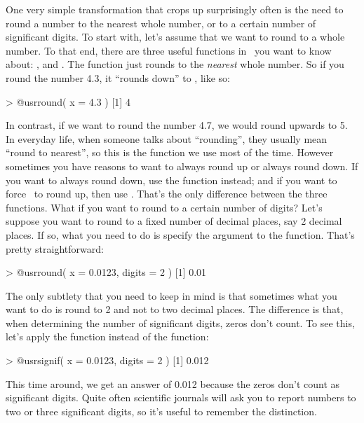 One very simple transformation that crops up surprisingly often is the need to round a number to the nearest whole number, or to a certain number of significant digits. To start with, let's assume that we want to round to a whole number. To that end, there are three useful functions in \R\ you want to know about: ,  and . The  function just rounds to the {\it nearest} whole number. So if you round the number 4.3, it ``rounds down'' to , like so:
\begin{rblock1}
> @usr{round( x = 4.3 )}
[1] 4
\end{rblock1}
In contrast, if we want to round the number 4.7, we would round upwards to 5. 
In everyday life, when someone talks about ``rounding'', they usually mean ``round to nearest'', so this is the function we use most of the time. However sometimes you have reasons to want to always round up or always round down. If you want to always round down, use the  function instead; and if you want to force \R\ to round up, then use . That's the only difference between the three functions. What if you want to round to a certain number of digits? Let's suppose you want to round to a fixed number of decimal places, say 2 decimal places. If so, what you need to do is specify the  argument to the  function. That's pretty straightforward:
\begin{rblock1}
> @usr{round( x = 0.0123, digits = 2 )}
[1] 0.01
\end{rblock1}
The only subtlety that you need to keep in mind is that sometimes what you want to do is round to 2  and not to two decimal places. The difference is that, when determining the number of significant digits, zeros don't count. To see this, let's apply the  function instead of the  function:
\begin{rblock1}
> @usr{signif( x = 0.0123, digits = 2 )}
[1] 0.012
\end{rblock1}
This time around, we get an answer of 0.012 because the zeros don't count as significant digits. Quite often scientific journals will ask you to report numbers to two or three significant digits, so it's useful to remember the distinction.






